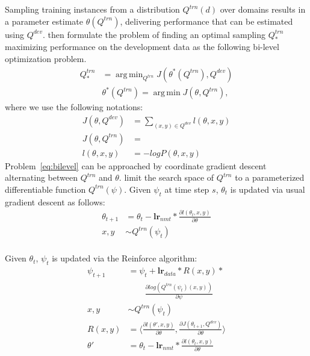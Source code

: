 \documentclass[11pt,a4paper]{article}
\newcommand{\fyTodo}[1]{\Todo[FY:]{\textcolor{orange}{#1}}}
\DeclareMathOperator*{\argmin}{arg\,min}
\begin{document}
Sampling training instances from a distribution $Q^{trn}(d)$ over domains results in a parameter estimate $\theta(Q^{trn})$, delivering performance that can be estimated using $Q^{dev}$. \cite{Wang20optimizing,Wang20balancing} then formulate the problem of finding an optimal sampling $Q^{trn}_{*}$ maximizing performance on the development data as the following bi-level optimization problem.
\begin{equation} \label{eq:bilevel}
\begin{split}
Q^{trn}_* &= \displaystyle{\mathop{\argmin}_{Q^{trn}} J(\theta^*(Q^{trn}), Q^{dev})} \\
					& \theta^*(Q^{trn}) = \displaystyle{\mathop{\argmin} J(\theta, Q^{trn})}, 
\end{split}
\end{equation}
where we use the following notations:\fyTodo{Overload Q, from domain to instances to pairs}
\begin{align*}
J(\theta, Q^{dev}) &= \displaystyle{\mathop{\sum}_{(x,y) \in Q^{dev}} l(\theta,x,y)} \\
J(\theta, Q^{trn}) &= \displaystyle{\mathop{E_{(x,y) \sim Q^{trn}}[l(\theta,x,y)]}} \\
l(\theta,x,y) &= - log P(\theta,x,y)
\end{align*}
Problem~\eqref{eq:bilevel} can be approached by coordinate gradient descent alternating between $Q^{trn}$ and $\theta$. \citet{Wang20balancing} limit the search space of $Q^{trn}$ to a parameterized differentiable function $Q^{trn}(\psi)$. Given $\psi_t$ at time step $s$, $\theta_t$ is updated via usual gradient descent as follows:
\begin{align*}
\theta_{t+1} &= \theta_t - \mathbf{lr}_{nmt} * \frac{\partial l(\theta_t, x,y)}{\partial \theta} \\
x,y &\sim Q^{trn}(\psi_t) \\
\end{align*}

Given $\theta_t$, $\psi_t$ is updated via the Reinforce algorithm:\fyTodo{Ref Reinforce}
\begin{align*}
  \psi_{t+1} &= \psi_t + \mathbf{lr}_{data} * R(x,y) * \\
  & \quad\quad \frac{\partial log(Q^{trn}(\psi_t)(x,y))}{\partial \psi} \\
x,y &\sim Q^{trn}(\psi_t) \\
R(x,y) &= \langle \frac{\partial l(\theta',x,y)}{\partial \theta}, \frac{\partial J(\theta_{t+1},Q^{dev})}{\partial \theta} \rangle \\
\theta' &= \theta_t - \mathbf{lr}_{nmt} * \frac{\partial l(\theta_t, x,y)}{\partial \theta} \\
\end{align*}
\end{document}
